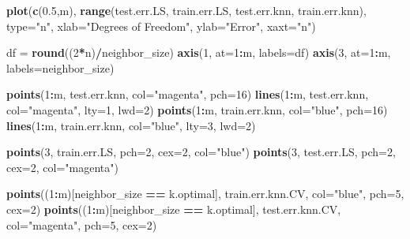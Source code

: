 \documentclass[
]{book}
\newenvironment{Shaded}{\begin{snugshade}}{\end{snugshade}}
\newcommand{\AttributeTok}[1]{\textcolor[rgb]{0.13,0.29,0.53}{#1}}
\newcommand{\DecValTok}[1]{\textcolor[rgb]{0.00,0.00,0.81}{#1}}
\newcommand{\FloatTok}[1]{\textcolor[rgb]{0.00,0.00,0.81}{#1}}
\newcommand{\FunctionTok}[1]{\textcolor[rgb]{0.13,0.29,0.53}{\textbf{#1}}}
\newcommand{\NormalTok}[1]{#1}
\newcommand{\OtherTok}[1]{\textcolor[rgb]{0.56,0.35,0.01}{#1}}
\newcommand{\SpecialCharTok}[1]{\textcolor[rgb]{0.81,0.36,0.00}{\textbf{#1}}}
\newcommand{\StringTok}[1]{\textcolor[rgb]{0.31,0.60,0.02}{#1}}
\begin{document}
\begin{Shaded}
\begin{Highlighting}[]
\FunctionTok{plot}\NormalTok{(}\FunctionTok{c}\NormalTok{(}\FloatTok{0.5}\NormalTok{,m), }\FunctionTok{range}\NormalTok{(test.err.LS, train.err.LS, test.err.knn, train.err.knn),}
                  \AttributeTok{type=}\StringTok{"n"}\NormalTok{, }\AttributeTok{xlab=}\StringTok{"Degrees of Freedom"}\NormalTok{, }\AttributeTok{ylab=}\StringTok{"Error"}\NormalTok{, }\AttributeTok{xaxt=}\StringTok{"n"}\NormalTok{)}

\NormalTok{df }\OtherTok{=} \FunctionTok{round}\NormalTok{((}\DecValTok{2}\SpecialCharTok{*}\NormalTok{n)}\SpecialCharTok{/}\NormalTok{neighbor\_size)}
\FunctionTok{axis}\NormalTok{(}\DecValTok{1}\NormalTok{, }\AttributeTok{at=}\DecValTok{1}\SpecialCharTok{:}\NormalTok{m, }\AttributeTok{labels=}\NormalTok{df)}
\FunctionTok{axis}\NormalTok{(}\DecValTok{3}\NormalTok{, }\AttributeTok{at=}\DecValTok{1}\SpecialCharTok{:}\NormalTok{m, }\AttributeTok{labels=}\NormalTok{neighbor\_size)}

\FunctionTok{points}\NormalTok{(}\DecValTok{1}\SpecialCharTok{:}\NormalTok{m, test.err.knn, }\AttributeTok{col=}\StringTok{"magenta"}\NormalTok{, }\AttributeTok{pch=}\DecValTok{16}\NormalTok{)}
\FunctionTok{lines}\NormalTok{(}\DecValTok{1}\SpecialCharTok{:}\NormalTok{m, test.err.knn, }\AttributeTok{col=}\StringTok{"magenta"}\NormalTok{, }\AttributeTok{lty=}\DecValTok{1}\NormalTok{, }\AttributeTok{lwd=}\DecValTok{2}\NormalTok{)}
\FunctionTok{points}\NormalTok{(}\DecValTok{1}\SpecialCharTok{:}\NormalTok{m, train.err.knn, }\AttributeTok{col=}\StringTok{"blue"}\NormalTok{, }\AttributeTok{pch=}\DecValTok{16}\NormalTok{)}
\FunctionTok{lines}\NormalTok{(}\DecValTok{1}\SpecialCharTok{:}\NormalTok{m, train.err.knn, }\AttributeTok{col=}\StringTok{"blue"}\NormalTok{, }\AttributeTok{lty=}\DecValTok{3}\NormalTok{, }\AttributeTok{lwd=}\DecValTok{2}\NormalTok{)}

\FunctionTok{points}\NormalTok{(}\DecValTok{3}\NormalTok{, train.err.LS, }\AttributeTok{pch=}\DecValTok{2}\NormalTok{, }\AttributeTok{cex=}\DecValTok{2}\NormalTok{, }\AttributeTok{col=}\StringTok{"blue"}\NormalTok{)}
\FunctionTok{points}\NormalTok{(}\DecValTok{3}\NormalTok{, test.err.LS, }\AttributeTok{pch=}\DecValTok{2}\NormalTok{, }\AttributeTok{cex=}\DecValTok{2}\NormalTok{, }\AttributeTok{col=}\StringTok{"magenta"}\NormalTok{)}

\FunctionTok{points}\NormalTok{((}\DecValTok{1}\SpecialCharTok{:}\NormalTok{m)[neighbor\_size }\SpecialCharTok{==}\NormalTok{ k.optimal], train.err.knn.CV, }\AttributeTok{col=}\StringTok{"blue"}\NormalTok{, }\AttributeTok{pch=}\DecValTok{5}\NormalTok{, }\AttributeTok{cex=}\DecValTok{2}\NormalTok{)}
\FunctionTok{points}\NormalTok{((}\DecValTok{1}\SpecialCharTok{:}\NormalTok{m)[neighbor\_size }\SpecialCharTok{==}\NormalTok{ k.optimal], test.err.knn.CV, }\AttributeTok{col=}\StringTok{"magenta"}\NormalTok{, }\AttributeTok{pch=}\DecValTok{5}\NormalTok{, }\AttributeTok{cex=}\DecValTok{2}\NormalTok{)}


\end{Highlighting}
\end{Shaded}
\end{document}
